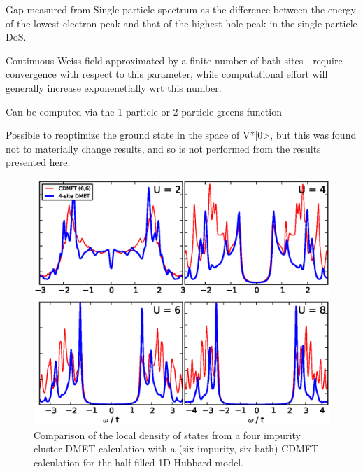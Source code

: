 \documentclass[aps,showpacs,twocolumn,nobibnotes]{revtex4}
\begin{document}
Gap measured from Single-particle spectrum as the difference between the energy of the lowest electron peak and that of the highest hole peak in the single-particle DoS.

Continuous Weiss field approximated by a finite number of bath sites - require convergence with respect to this parameter, while computational effort will generally increase exponenetially wrt this number.

Can be computed via the 1-particle or 2-particle greens function

Possible to reoptimize the ground state in the space of V*|0>, but this was found not to materially change results, and so is not performed from the results presented here.

\begin{figure}
\begin{center}
\includegraphics[scale=0.475]{Plots/1D_Spectra/1D_Hub_Spectra.eps}
\end{center}
\caption{Comparison of the local density of states from a four impurity cluster DMET calculation with a
(six impurity, six bath) CDMFT calculation for the half-filled 1D Hubbard model.}
\label{1D_DOS}
\end{figure}
\end{document}

